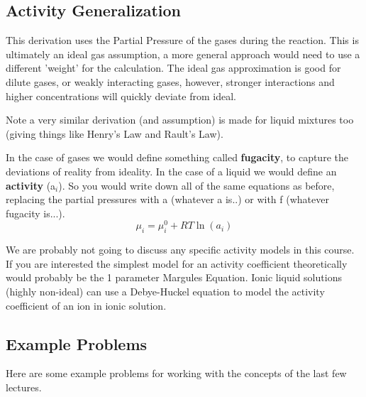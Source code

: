 \documentclass{article}
\begin{document}
\subsection*{Activity Generalization}
This derivation uses the Partial Pressure of the gases during the reaction. 
This is ultimately an ideal gas assumption, a more general approach would need to use a different 'weight' for  the calculation. 
The ideal gas approximation is good for dilute gases, or weakly interacting gases, however, stronger interactions and higher concentrations will quickly deviate from ideal. 

Note a very similar derivation (and assumption) is made for liquid mixtures too (giving things like Henry's Law and Rault's Law). 

In the case of gases we would define something called \textbf{fugacity}, to capture the deviations of reality from ideality.
In the case of a liquid we would define an \textbf{activity} (a$_i$). 
So you would write down all of the same equations as before, replacing the partial pressures with a (whatever a is..) or with f (whatever fugacity is...). 
\begin{equation}
\mu_i = \mu_i^0 + RT \ln(a_i)
\end{equation}

We are probably not going to discuss any specific activity models in this course.
If you are interested the simplest model for an activity coefficient theoretically would probably be the 1 parameter Margules Equation.
Ionic liquid solutions (highly non-ideal) can use a Debye-Huckel equation to model the activity coefficient of an ion in ionic solution.
 
\subsection*{Example Problems}
Here are some example problems for working with the concepts of the last few lectures. 
\end{document}
